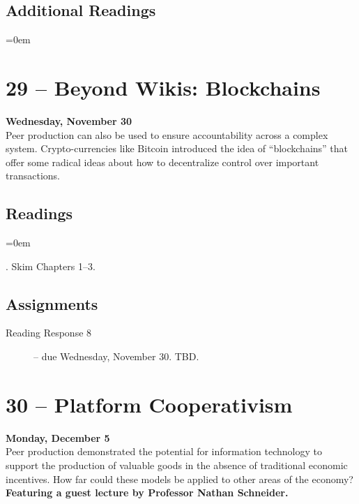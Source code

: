\documentclass[10pt]{memoir}
\newenvironment{readinglist}{
\begin{list}{}{\leftmargin=8pt \itemindent=0em}
  \setlength{\itemsep}{8pt}
  \setlength{\parskip}{0em}
  \setlength{\parsep}{1em}
  \setlength{\parindent}{8em}}
{\end{list}}
\begin{document}
    \subsection{Additional Readings}
    \begin{readinglist}
        \item {}
        \item {}
        \item {}
        \item {}
    \end{readinglist}

\section{29 -- Beyond Wikis: Blockchains}
\textcolor{CUGold}{\textbf{Wednesday, November 30}}\\
Peer production can also be used to ensure accountability across a complex system. Crypto-currencies like Bitcoin introduced the idea of ``blockchains'' that offer some radical ideas about how to decentralize control over important transactions.

    \subsection{Readings}
    \begin{readinglist}
        \item {}. Skim Chapters 1--3.
    \end{readinglist}
    
    \subsection{Assignments}
    \begin{description}%
        \item[Reading Response 8 ] -- due Wednesday, November 30. TBD.
    \end{description}
    
\section{30 -- Platform Cooperativism}
\textcolor{CUGold}{\textbf{Monday, December 5}}\\
Peer production demonstrated the potential for information technology to support the production of valuable goods in the absence of traditional economic incentives. How far could these models be applied to other areas of the economy? \textbf{Featuring a guest lecture by Professor Nathan Schneider.}
\end{document}
